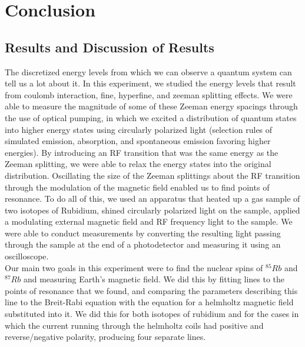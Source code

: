 \documentclass{article}
\begin{document}



\section{Conclusion}
    \subsection{Results and Discussion of Results}
    The discretized energy levels from which we can observe a quantum system can tell us a lot about it. In this experiment, we studied the energy levels that result from coulomb interaction, fine, hyperfine, and zeeman splitting effects. We were able to measure the magnitude of some of these Zeeman energy spacings through the use of optical pumping, in which we excited a distribution of quantum states into higher energy states using circularly polarized light (selection rules of simulated emission, absorption, and spontaneous emission favoring higher energies). By introducing an RF transition that was the same energy as the Zeeman splitting, we were able to relax the energy states into the original distribution. Oscillating the size of the Zeeman splittings about the RF transition through the modulation of the magnetic field enabled us to find points of resonance. To do all of this, we used an apparatus that heated up a gas sample of two isotopes of Rubidium, shined circularly polarized light on the sample, applied a modulating external magnetic field and RF frequency light to the sample. We were able to conduct measurements by converting the resulting light passing through the sample at the end of a photodetector and measuring it using an oscilloscope.
    \\\indent Our main two goals in this experiment were to find the nuclear spins of $^{85}Rb$ and $^{87}Rb$ and measuring Earth's magnetic field. We did this by fitting lines to the points of resonance that we found, and comparing the parameters describing this line to the Breit-Rabi equation with the equation for a helmholtz magnetic field substituted into it. We did this for both isotopes of rubidium and for the cases in which the current running through the helmholtz coils had positive and reverse/negative polarity, producing four separate lines.
\end{document}
